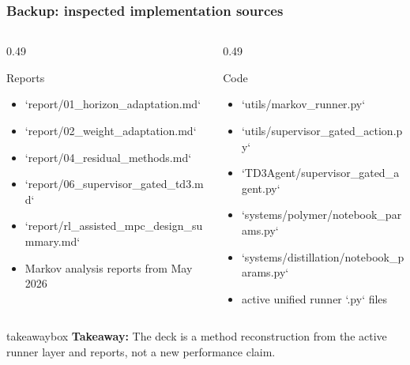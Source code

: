 \documentclass[aspectratio=169]{beamer}
\newcommand{\takeawaybox}[1]{%
\vspace{0.02cm}
\begin{center}
\begin{beamercolorbox}[wd=0.94\textwidth,sep=3pt,center,rounded=true,shadow=false]{takeawaybox}
\scriptsize
\textbf{\textcolor{maroon1}{Takeaway:}} #1
\end{beamercolorbox}
\end{center}
}
\begin{document}
\begin{frame}
\frametitle{\large \textbf{Backup: inspected implementation sources}}
\scriptsize

\begin{columns}[T,onlytextwidth]
\begin{column}{0.49\textwidth}
\begin{block}{Reports}
\begin{itemize}\justifying
  \setlength\itemsep{0.3ex}
  \item `report/01\_horizon\_adaptation.md`
  \item `report/02\_weight\_adaptation.md`
  \item `report/04\_residual\_methods.md`
  \item `report/06\_supervisor\_gated\_td3.md`
  \item `report/rl\_assisted\_mpc\_design\_summary.md`
  \item Markov analysis reports from May 2026
\end{itemize}
\end{block}
\end{column}

\begin{column}{0.49\textwidth}
\begin{block}{Code}
\begin{itemize}\justifying
  \setlength\itemsep{0.3ex}
  \item `utils/markov\_runner.py`
  \item `utils/supervisor\_gated\_action.py`
  \item `TD3Agent/supervisor\_gated\_agent.py`
  \item `systems/polymer/notebook\_params.py`
  \item `systems/distillation/notebook\_params.py`
  \item active unified runner `.py` files
\end{itemize}
\end{block}
\end{column}
\end{columns}

\takeawaybox{The deck is a method reconstruction from the active runner layer and reports, not a new performance claim.}
\end{frame}
\end{document}
